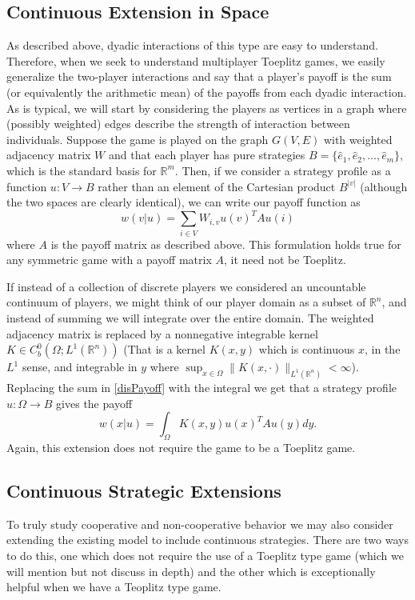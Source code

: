 \documentclass[aps,
preprint,
groupedaddress,
showkeys,
amsmath]{revtex4-2}
\begin{document}
\subsection{Continuous Extension in Space}\label{SUBSEC:ContinuousExtensionsInSpace}
As described above, dyadic interactions of this type are easy to understand. Therefore, when we seek to understand multiplayer Toeplitz games, we easily generalize the two-player interactions and say that a player's payoff is the sum (or equivalently the arithmetic mean) of the payoffs from each dyadic interaction.
As is typical, we will start by considering the players as vertices in a graph where (possibly weighted) edges describe the strength of interaction between individuals. Suppose the game is played on the graph $G(V,E)$ with weighted adjacency matrix $W$ and that each player has pure strategies $B=\{\hat{e}_1,\hat{e}_2,...,\hat{e}_m\}$, which is the standard basis for $\mathbb{R}^m$. Then, if we consider a strategy profile as a function $u:V\rightarrow B$ rather than an element of the Cartesian product $B^{|v|}$ (although the two spaces are clearly identical), we can write our payoff function as 
\begin{equation}\label{disPayoff}
    w(v|u)=\sum_{i\in V}W_{i,v}u(v)^TAu(i)    
\end{equation}
where $A$ is the payoff matrix as described above. This formulation holds true for any symmetric game with a payoff matrix $A$, it need not be Toeplitz. 

If instead of a collection of discrete players we considered an uncountable continuum of players, we might think of our player domain as a subset of $\mathbb{R}^n$, and instead of summing we will integrate over the entire domain. The weighted adjacency matrix is replaced by a nonnegative integrable kernel $K\in C_b^0(\Omega; L^1(\mathbb{R}^n))$ (That is a kernel $K(x,y)$ which is continuous $x$, in the $L^1$ sense, and integrable in $y$ where $\sup_{x\in\Omega}\|K(x,\cdot)\|_{L^1(\mathbb{R}^n)}<\infty$). Replacing the sum in \eqref{disPayoff} with the integral we get that a strategy profile $u:\Omega\rightarrow B$ gives the payoff
\begin{equation}\label{ctsSpacePayoff}
w(x|u)=\int_\Omega K(x,y)u(x)^TAu(y)dy.
\end{equation}
Again, this extension does not require the game to be a Toeplitz game. 

\subsection{Continuous Strategic Extensions}\label{SUBSEC:ContinuousExtensionsInStrategy}
To truly study cooperative and non-cooperative behavior we may also consider extending the existing model to include continuous strategies. There are two ways to do this, one which does not require the use of a Toeplitz type game (which we will mention but not discuss in depth) and the other which is exceptionally helpful when we have a Teoplitz type game. 
\end{document}
